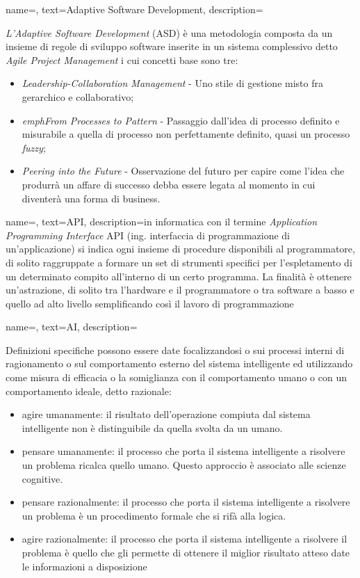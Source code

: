 

{
    name=,
    text=Adaptive Software Development,
    description={\emph{L’Adaptive Software Development} (ASD) è una
metodologia composta da un insieme di regole di sviluppo software inserite in un
sistema complessivo detto \emph{Agile Project Management} i cui concetti base sono tre:
\begin{itemize}
	\item \emph{Leadership-Collaboration Management} - Uno stile di gestione misto fra gerarchico e collaborativo;
	\item \emph{emphFrom Processes to Pattern} - Passaggio dall’idea di processo definito e
misurabile a quella di processo non perfettamente definito, quasi un processo \emph{fuzzy};
	\item \emph{Peering into the Future} - Osservazione del futuro per capire come l’idea che produrrà un affare di successo debba essere legata al momento in cui diventerà una forma di business.
\end{itemize}}
}

{
    name=,
    text=API,
    description={in informatica con il termine \emph{Application Programming
Interface} API (ing. interfaccia di programmazione di un’applicazione) si
indica ogni insieme di procedure disponibili al programmatore, di solito raggruppate
a formare un set di strumenti specifici per l’espletamento di un determinato
compito all’interno di un certo programma. La finalità è ottenere un’astrazione,
di solito tra l’hardware e il programmatore o tra software a basso e quello ad alto
livello semplificando così il lavoro di programmazione}
}

{
    name=,
    text=AI,
    description={Definizioni specifiche possono essere date focalizzandosi o sui processi interni di ragionamento o sul comportamento esterno del sistema intelligente ed utilizzando come misura di efficacia o la somiglianza con il comportamento umano o con un comportamento ideale, detto razionale:
\begin{itemize}
	\item agire umanamente: il risultato dell’operazione compiuta dal sistema intelligente non è distinguibile da quella svolta da un umano.
	\item pensare umanamente: il processo che porta il sistema intelligente a risolvere un problema ricalca quello umano. Questo approccio è associato alle scienze cognitive.
	\item pensare razionalmente: il processo che porta il sistema intelligente a risolvere un problema è un procedimento formale che si rifà alla logica.
	\item agire razionalmente: il processo che porta il sistema intelligente a risolvere il problema è quello che gli permette di ottenere il miglior risultato atteso date le informazioni a disposizione
\end{itemize}}
}


